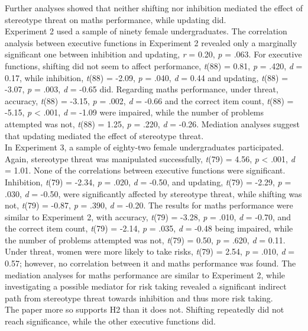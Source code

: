 \documentclass[
  stu,floatsintext]{apa7}
\begin{document}
Further analyses showed that neither shifting nor inhibition mediated the effect of stereotype threat on maths performance, while updating did.\\
Experiment 2 used a sample of ninety female undergraduates.
The correlation analysis between executive functions in Experiment 2 revealed only a marginally significant one between inhibition and updating, \emph{r} = 0.20, \emph{p} = .063.
For executive functions, shifting did not seem to affect performance, \emph{t}(88) = 0.81, \emph{p} = .420, \emph{d} = 0.17, while inhibition, \emph{t}(88) = -2.09, \emph{p} = .040, \emph{d} = 0.44 and updating, \emph{t}(88) = -3.07, \emph{p} = .003, \emph{d} = -0.65 did.
Regarding maths performance, under threat, accuracy, \emph{t}(88) = -3.15, \emph{p} = .002, \emph{d} = -0.66 and the correct item count, \emph{t}(88) = -5.15, \emph{p} \textless{} .001, \emph{d} = -1.09 were impaired, while the number of problems attempted was not, \emph{t}(88) = 1.25, \emph{p} = .220, \emph{d} = -0.26.
Mediation analyses suggest that updating mediated the effect of stereotype threat.\\
In Experiment 3, a sample of eighty-two female undergraduates participated.
Again, stereotype threat was manipulated successfully, \emph{t}(79) = 4.56, \emph{p} \textless{} .001, \emph{d} = 1.01.
None of the correlations between executive functions were significant.
Inhibition, \emph{t}(79) = -2.34, \emph{p} = .020, \emph{d} = -0.50, and updating, \emph{t}(79) = -2.29, \emph{p} = .030, \emph{d} = -0.50, were significantly affected by stereotype threat, while shifting was not, \emph{t}(79) = -0.87, \emph{p} = .390, \emph{d} = -0.20.
The results for maths performance were similar to Experiment 2, with accuracy, \emph{t}(79) = -3.28, \emph{p} = .010, \emph{d} = -0.70, and the correct item count, \emph{t}(79) = -2.14, \emph{p} = .035, \emph{d} = -0.48 being impaired, while the number of problems attempted was not, \emph{t}(79) = 0.50, \emph{p} = .620, \emph{d} = 0.11.
Under threat, women were more likely to take risks, \emph{t}(79) = 2.54, \emph{p} = .010, \emph{d} = 0.57; however, no correlation between it and maths performance was found.
The mediation analyses for maths performance are similar to Experiment 2, while investigating a possible mediator for risk taking revealed a significant indirect path from stereotype threat towards inhibition and thus more risk taking.\\
The paper more so supports H2 than it does not. Shifting repeatedly did not reach significance, while the other executive functions did.
\end{document}
